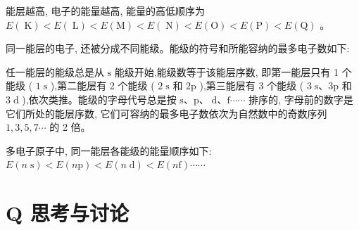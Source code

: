 \documentclass[10pt]{article}
\begin{document}
\begin{center}
\end{center}

能层越高, 电子的能量越高, 能量的高低顺序为 \(E\left( \mathrm{\;K}\right) < E\left( \mathrm{\;L}\right) < E\left( \mathrm{M}\right) < E\left( \mathrm{\;N}\right) < E\left( \mathrm{O}\right) < E\left( \mathrm{P}\right) < E\left( \mathrm{Q}\right)\) 。

同一能层的电子, 还被分成不同能级。能级的符号和所能容纳的最多电子数如下:

\begin{center}
\end{center}

任一能层的能级总是从 \(\mathrm{s}\) 能级开始,能级数等于该能层序数, 即第一能层只有 1 个能级 ( \(1\mathrm{\;s}\) ),第二能层有 2 个能级 ( \(2\mathrm{\;s}\) 和 \(2\mathrm{p}\) ),第三能层有 3 个能级 ( \(3\mathrm{\;s}\text{、}3\mathrm{p}\) 和 \(3\mathrm{\;d}\) ),依次类推。能级的字母代号总是按 \(\mathrm{s}\text{、}\mathrm{p}\text{、}\mathrm{\;d}\text{、}\mathrm{f}\cdots \cdots\) 排序的, 字母前的数字是它们所处的能层序数, 它们可容纳的最多电子数依次为自然数中的奇数序列 \(1,3,5,7\cdots\) 的 2 倍。

多电子原子中, 同一能层各能级的能量顺序如下: \(E\left( {n\mathrm{\;s}}\right) < E\left( {n\mathrm{p}}\right) < E\left( {n\mathrm{\;d}}\right) < E\left( {n\mathrm{f}}\right) \cdots \cdots\)

\section*{Q 思考与讨论}
\end{document}
